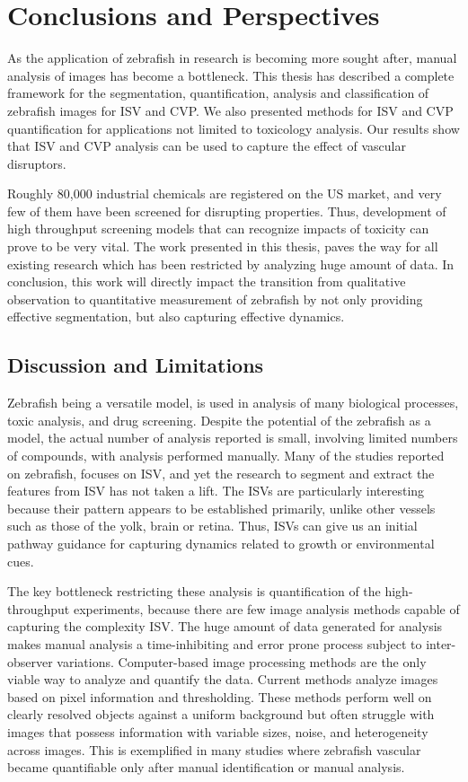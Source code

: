 \chapter{Conclusions and Perspectives}\label{chap:conclusion}

As the application of zebrafish in research is becoming more sought after, manual analysis of images has become a bottleneck. This thesis has described a complete framework for the segmentation, quantification, analysis and classification of zebrafish images for ISV and CVP. We also presented methods for ISV and CVP quantification for applications not limited to toxicology analysis. Our results show that ISV and CVP analysis can be used to capture the effect of vascular disruptors. 

Roughly 80,000 industrial chemicals are registered on the US market, and very few of them have been screened for disrupting properties. Thus, development of high throughput screening models that can recognize impacts of toxicity can prove to be very vital. The work presented in this thesis, paves the way for all existing research which has been restricted by analyzing huge amount of data. In conclusion, this work will directly impact the transition from qualitative observation to quantitative measurement of zebrafish by not only providing effective segmentation, but also capturing effective dynamics.


\section{Discussion and Limitations}

Zebrafish being a versatile model, is used in analysis of many biological processes, toxic analysis, and drug screening. Despite the potential of the zebrafish as a model, the actual number of analysis reported is small, involving limited numbers of compounds, with analysis performed manually. Many of the studies reported on zebrafish, focuses on ISV, and yet the research to segment and extract the features from ISV has not taken a lift. The ISVs are particularly interesting because their pattern appears to be established primarily, unlike other vessels such as those of the yolk, brain or retina. Thus, ISVs can give us an initial pathway guidance for capturing dynamics related to growth or environmental cues. 

The key bottleneck restricting these analysis is quantification of the high-throughput experiments, because there are few image analysis methods capable of capturing the complexity ISV. The huge amount of data generated for analysis makes manual analysis a time-inhibiting and error prone process subject to inter-observer variations. Computer-based image processing methods are the only viable way to analyze and quantify the data. Current methods analyze images based on pixel information and thresholding. These methods perform well on clearly resolved objects against a uniform background but often struggle with images that possess information with variable sizes, noise, and heterogeneity across images. This is exemplified in many studies where zebrafish vascular became quantifiable only after manual identification or manual analysis. 

